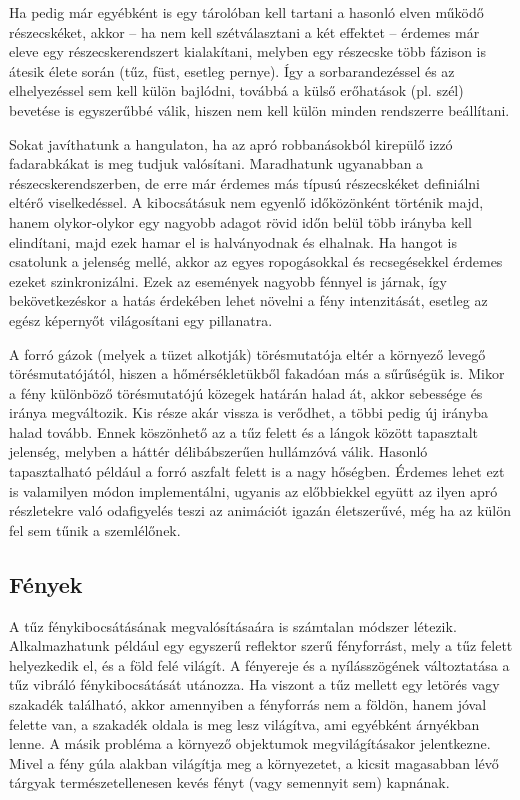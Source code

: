 Ha pedig már egyébként is egy tárolóban kell tartani a hasonló elven működő részecskéket, akkor -- ha nem kell szétválasztani a két effektet -- érdemes már eleve egy részecskerendszert kialakítani, melyben egy részecske több fázison is átesik élete során (tűz, füst, esetleg pernye). Így a sorbarandezéssel és az elhelyezéssel sem kell külön bajlódni, továbbá a külső erőhatások (pl. szél) bevetése is egyszerűbbé válik, hiszen nem kell külön minden rendszerre beállítani.

Sokat javíthatunk a hangulaton, ha az apró robbanásokból kirepülő izzó fadarabkákat is meg tudjuk valósítani. Maradhatunk ugyanabban a részecskerendszerben, de erre már érdemes más típusú részecskéket definiálni eltérő viselkedéssel. A kibocsátásuk nem egyenlő időközönként történik majd, hanem olykor-olykor egy nagyobb adagot rövid időn belül több irányba kell elindítani, majd ezek hamar el is halványodnak és elhalnak. Ha hangot is csatolunk a jelenség mellé, akkor az egyes ropogásokkal és recsegésekkel érdemes ezeket szinkronizálni. Ezek az események nagyobb fénnyel is járnak, így bekövetkezéskor a hatás érdekében lehet növelni a fény intenzitását, esetleg az egész képernyőt világosítani egy pillanatra. 

A forró gázok (melyek a tüzet alkotják) törésmutatója eltér a környező levegő törésmutatójától, hiszen a hőmérsékletükből fakadóan más a sűrűségük is. Mikor a fény különböző törésmutatójú közegek határán halad át, akkor sebessége és iránya megváltozik. Kis része akár vissza is verődhet, a többi pedig új irányba halad tovább. Ennek köszönhető az a tűz felett és a lángok között tapasztalt jelenség, melyben a háttér délibábszerűen hullámzóvá válik. Hasonló tapasztalható például a forró aszfalt felett is a nagy hőségben. Érdemes lehet ezt is valamilyen módon implementálni, ugyanis az előbbiekkel együtt az ilyen apró részletekre való odafigyelés teszi az animációt igazán életszerűvé, még ha az külön fel sem tűnik a szemlélőnek.

\subsection{Fények}
A tűz fénykibocsátásának megvalósításaára is számtalan módszer létezik. Alkalmazhatunk például egy egyszerű reflektor szerű fényforrást, mely a tűz felett helyezkedik el, és a föld felé világít. A fényereje és a nyílásszögének változtatása a tűz vibráló fénykibocsátását utánozza. Ha viszont a tűz mellett egy letörés vagy szakadék található, akkor amennyiben a fényforrás nem a földön, hanem jóval felette van, a szakadék oldala is meg lesz világítva, ami egyébként árnyékban lenne. A másik probléma a környező objektumok megvilágításakor jelentkezne. Mivel a fény gúla alakban világítja meg a környezetet, a kicsit magasabban lévő tárgyak természetellenesen kevés fényt (vagy semennyit sem) kapnának.

